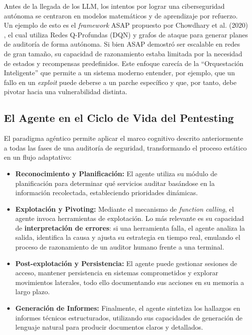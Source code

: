 Antes de la llegada de los LLM, los intentos por lograr una ciberseguridad autónoma se centraron en modelos matemáticos y de aprendizaje por refuerzo. Un ejemplo de esto es el \textit{framework} ASAP propuesto por Chowdhary et al. (2020) \cite{cibersec2020}, el cual utiliza Redes Q-Profundas (DQN) y grafos de ataque para generar planes de auditoría de forma autónoma. Si bien ASAP demostró ser escalable en redes de gran tamaño, su capacidad de razonamiento estaba limitada por la necesidad de estados y recompensas predefinidos. Este enfoque carecía de la ``Orquestación Inteligente'' que permite a un sistema moderno entender, por ejemplo, que un fallo en un \textit{exploit} puede deberse a un parche específico y que, por tanto, debe pivotar hacia una vulnerabilidad distinta.

\subsection{El Agente en el Ciclo de Vida del Pentesting}

El paradigma agéntico permite aplicar el marco cognitivo descrito anteriormente a todas las fases de una auditoría de seguridad, transformando el proceso estático en un flujo adaptativo:

\begin{itemize}
    \item \textbf{Reconocimiento y Planificación:} El agente utiliza su módulo de planificación para determinar qué servicios auditar basándose en la información recolectada, estableciendo prioridades dinámicas.
    \item \textbf{Explotación y Pivoting:} Mediante el mecanismo de \textit{function calling}, el agente invoca herramientas de explotación. Lo más relevante es su capacidad de \textbf{interpretación de errores}: si una herramienta falla, el agente analiza la salida, identifica la causa y ajusta su estrategia en tiempo real, emulando el proceso de razonamiento de un auditor humano frente a una terminal.
    \item \textbf{Post-explotación y Persistencia:} El agente puede gestionar sesiones de acceso, mantener persistencia en sistemas comprometidos y explorar movimientos laterales, todo ello documentando sus acciones en su memoria a largo plazo.
    \item \textbf{Generación de Informes:} Finalmente, el agente sintetiza los hallazgos en informes técnicos estructurados, utilizando sus capacidades de generación de lenguaje natural para producir documentos claros y detallados.
\end{itemize}

